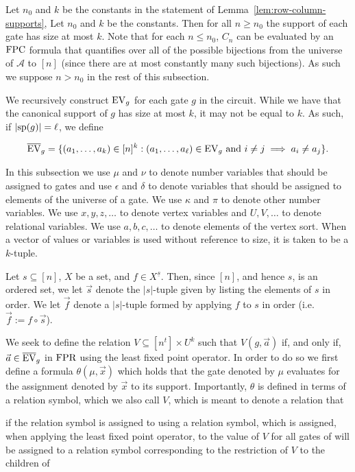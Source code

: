\documentclass[../paper.tex]{subfiles}
\begin{document}
Let $n_0$ and $k$ be the constants in the statement of
Lemma~\ref{lem:row-column-supports}, Let $n_0$ and $k$ be the constants. Then
for all $n \geq n_0$ the support of each gate has size at most $k$. Note that
for each $n \leq n_0$, $C_n$ can be evaluated by an $\text{\upshape FPC}$ formula that
quantifies over all of the possible bijections from the universe of
$\mathcal{A}$ to $[n]$ (since there are at most constantly many such
bijections). As such we suppose $n > n_0$ in the rest of this subsection.

We recursively construct $\text{EV}_g$ for each gate $g$ in the circuit. While we have
that the canonical support of $g$ has size at most $k$, it may not be equal to
$k$. As such, if $\vert \text{sp}(g) \vert = \ell$, we define

\begin{align*}
	\overline{\text{EV}}_g = \{ (a_1, \ldots , a_k) \in [n]^k : (a_1 , \ldots , a_\ell ) \in \text{EV}_g \text{ and } i \neq j \implies a_i \neq a_j \}. 
\end{align*}

In this subsection we use $\mu$ and $\nu$ to denote number variables that should
be assigned to gates and use $\epsilon$ and $\delta$ to denote variables that
should be assigned to elements of the universe of a gate. We use $\kappa$ and
$\pi$ to denote other number variables. We use $x, y, z, \ldots$ to denote
vertex variables and $U, V, \ldots$ to denote relational variables. We use $a,
b, c , \ldots$ to denote elements of the vertex sort. When a vector of values or
variables is used without reference to size, it is taken to be a $k$-tuple.

Let $s \subseteq [n]$, $X$ be a set, and $f \in X^{\underline{s}}$. Then, since
$[n]$, and hence $s$, is an ordered set, we let $\vec{s}$ denote the $\vert s
\vert$-tuple given by listing the elements of $s$ in order. We let $\vec{f}$
denote a $\vert s \vert$-tuple formed by applying $f$ to $s$ in order (i.e.
$\vec{f} := f \circ \vec{s}$).

We seek to define the relation $V \subseteq [n^t] \times U^k$ such that $V(g,
\vec{a})$ if, and only if, $\vec{a} \in \overline {\text{EV}}_g$ in $\text{\upshape FPR}$ using the
least fixed point operator. In order to do so we first define a formula
$\theta(\mu, \vec{x})$ which holds that the gate denoted by $\mu$ evaluates for
the assignment denoted by $\vec{x}$ to its support. Importantly, $\theta$ is
defined in terms of a relation symbol, which we also call $V$, which is meant to
denote a relation that

if the relation symbol is assigned to using a relation symbol, which is
assigned, when applying the least fixed point operator, to the value of $V$ for
all gates of will be assigned to a relation symbol corresponding to the
restriction of $V$ to the children of
\end{document}
